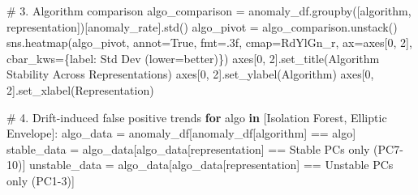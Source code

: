 \documentclass[
  letterpaper,
  DIV=11,
  numbers=noendperiod]{scrartcl}
\newenvironment{Shaded}{\begin{snugshade}}{\end{snugshade}}
\newcommand{\CommentTok}[1]{\textcolor[rgb]{0.37,0.37,0.37}{#1}}
\newcommand{\ControlFlowTok}[1]{\textcolor[rgb]{0.00,0.23,0.31}{\textbf{#1}}}
\newcommand{\DecValTok}[1]{\textcolor[rgb]{0.68,0.00,0.00}{#1}}
\newcommand{\KeywordTok}[1]{\textcolor[rgb]{0.00,0.23,0.31}{\textbf{#1}}}
\newcommand{\NormalTok}[1]{\textcolor[rgb]{0.00,0.23,0.31}{#1}}
\newcommand{\OperatorTok}[1]{\textcolor[rgb]{0.37,0.37,0.37}{#1}}
\newcommand{\StringTok}[1]{\textcolor[rgb]{0.13,0.47,0.30}{#1}}
\newcommand{\VariableTok}[1]{\textcolor[rgb]{0.07,0.07,0.07}{#1}}
\renewenvironment{Shaded}{%
  \begin{tcolorbox}[%
    enhanced,%
    colback=codebg,%
    colframe=codebg,%
    borderline west={3pt}{0pt}{sectionblue},%
    fontupper=\small\ttfamily,%
    boxrule=0pt,%
    arc=0pt,%
    boxsep=5pt,%
    left=2mm,%
    right=2mm,%
    top=2mm,%
    bottom=2mm%
  ]%
}{%
  \end{tcolorbox}%
}
\begin{document}
\begin{Shaded}
\begin{Highlighting}[]
\CommentTok{\# 3. Algorithm comparison}
\NormalTok{algo\_comparison }\OperatorTok{=}\NormalTok{ anomaly\_df.groupby([}\StringTok{\textquotesingle{}algorithm\textquotesingle{}}\NormalTok{, }\StringTok{\textquotesingle{}representation\textquotesingle{}}\NormalTok{])[}\StringTok{\textquotesingle{}anomaly\_rate\textquotesingle{}}\NormalTok{].std()}
\NormalTok{algo\_pivot }\OperatorTok{=}\NormalTok{ algo\_comparison.unstack()}
\NormalTok{sns.heatmap(algo\_pivot, annot}\OperatorTok{=}\VariableTok{True}\NormalTok{, fmt}\OperatorTok{=}\StringTok{\textquotesingle{}.3f\textquotesingle{}}\NormalTok{, cmap}\OperatorTok{=}\StringTok{\textquotesingle{}RdYlGn\_r\textquotesingle{}}\NormalTok{, }
\NormalTok{            ax}\OperatorTok{=}\NormalTok{axes[}\DecValTok{0}\NormalTok{, }\DecValTok{2}\NormalTok{], cbar\_kws}\OperatorTok{=}\NormalTok{\{}\StringTok{\textquotesingle{}label\textquotesingle{}}\NormalTok{: }\StringTok{\textquotesingle{}Std Dev (lower=better)\textquotesingle{}}\NormalTok{\})}
\NormalTok{axes[}\DecValTok{0}\NormalTok{, }\DecValTok{2}\NormalTok{].set\_title(}\StringTok{\textquotesingle{}Algorithm Stability Across Representations\textquotesingle{}}\NormalTok{)}
\NormalTok{axes[}\DecValTok{0}\NormalTok{, }\DecValTok{2}\NormalTok{].set\_ylabel(}\StringTok{\textquotesingle{}Algorithm\textquotesingle{}}\NormalTok{)}
\NormalTok{axes[}\DecValTok{0}\NormalTok{, }\DecValTok{2}\NormalTok{].set\_xlabel(}\StringTok{\textquotesingle{}Representation\textquotesingle{}}\NormalTok{)}

\CommentTok{\# 4. Drift{-}induced false positive trends}
\ControlFlowTok{for}\NormalTok{ algo }\KeywordTok{in}\NormalTok{ [}\StringTok{\textquotesingle{}Isolation Forest\textquotesingle{}}\NormalTok{, }\StringTok{\textquotesingle{}Elliptic Envelope\textquotesingle{}}\NormalTok{]:}
\NormalTok{    algo\_data }\OperatorTok{=}\NormalTok{ anomaly\_df[anomaly\_df[}\StringTok{\textquotesingle{}algorithm\textquotesingle{}}\NormalTok{] }\OperatorTok{==}\NormalTok{ algo]}
\NormalTok{    stable\_data }\OperatorTok{=}\NormalTok{ algo\_data[algo\_data[}\StringTok{\textquotesingle{}representation\textquotesingle{}}\NormalTok{] }\OperatorTok{==} \StringTok{\textquotesingle{}Stable PCs only (PC7{-}10)\textquotesingle{}}\NormalTok{]}
\NormalTok{    unstable\_data }\OperatorTok{=}\NormalTok{ algo\_data[algo\_data[}\StringTok{\textquotesingle{}representation\textquotesingle{}}\NormalTok{] }\OperatorTok{==} \StringTok{\textquotesingle{}Unstable PCs only (PC1{-}3)\textquotesingle{}}\NormalTok{]}
    

\end{Highlighting}
\end{Shaded}
\end{document}
